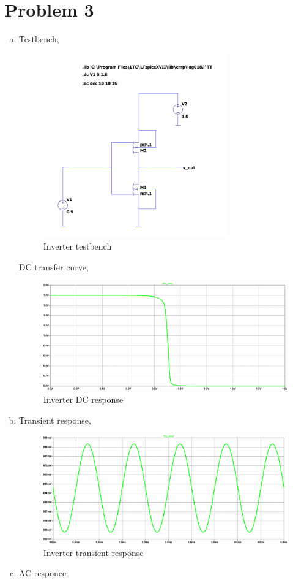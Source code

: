 \documentclass{article}
\begin{document}
\section{Problem 3}
\label{sec:orgdf846e0}
\begin{enumerate}[(a)]
\item Testbench,
\begin{figure}[H]
\centering
\includegraphics[height=300px]{img/q3/inverter.pdf}
\caption{\label{fig:inv-q3}Inverter testbench}
\end{figure}

DC transfer curve,
\begin{figure}[H]
\centering
\includegraphics[width=.9\linewidth]{img/q3/vout-vin-dc.pdf}
\caption{\label{fig:vout-vin-dc-q3}Inverter DC response}
\end{figure}

\item Transient response,

\begin{figure}[H]
\centering
\includegraphics[width=.9\linewidth]{img/q3/transient.pdf}
\caption{\label{fig:trans-q3}Inverter transient response}
\end{figure}
\item AC responce


\end{enumerate}
\end{document}
